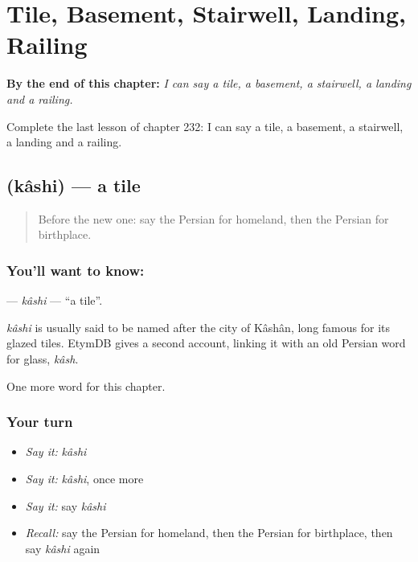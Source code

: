 
\chapter{Tile, Basement, Stairwell, Landing, Railing}
\label{ch:fa-tile-basement-stairwell-landing-railing}

\begin{chapteropening}
\textbf{By the end of this chapter:} \emph{I can say a tile, a basement, a stairwell, a landing and a railing.}

Complete the last lesson of chapter 232: I can say a tile, a basement, a stairwell, a landing and a railing.
\end{chapteropening}

\section[\texorpdfstring{\fa{کاشی} (kâshi)}{کاشی (kâshi)}]{ (kâshi) — a tile}

\label{lesson:FA-C232-kashi}



\begin{quote}
Before the new one: say the Persian for homeland, then the Persian for birthplace.
\end{quote}

\subsection*{You'll want to know: }
\textbf{} — \emph{kâshi} — \textquotedblleft{}a tile\textquotedblright{}.

\begin{cousinweb}
\emph{kâshi} is usually said to be named after the city of Kâshân, long famous for its glazed tiles. EtymDB gives a second account, linking it with an old Persian word for glass, \emph{kâsh}.
\end{cousinweb}

\begin{grammarlens}[title={What you've built}]
One more word for this chapter.
\end{grammarlens}

\subsection*{Your turn}
\begin{itemize}
\raggedright
  \item \emph{Say it:} \emph{kâshi}
  \item \emph{Say it:} \emph{kâshi}, once more
  \item \emph{Say it:} say \emph{kâshi}
  \item \emph{Recall:} say the Persian for homeland, then the Persian for birthplace, then say \emph{kâshi} again
\end{itemize}

